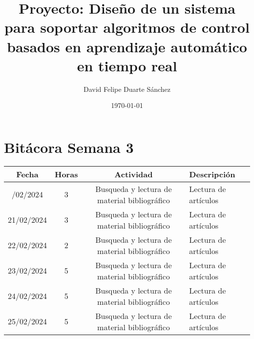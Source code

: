 \documentclass{article}
\title{Proyecto: Diseño de un sistema para soportar algoritmos de control basados en aprendizaje automático en tiempo real}
\author{David Felipe Duarte Sánchez}
\date{\today}
\begin{document}
\maketitle
\section*{Bitácora Semana 3}

\begin{longtable}[c]{|c|c|c|p{6cm}|}
\hline
\textbf{Fecha} & \textbf{Horas} & \textbf{Actividad} & \textbf{Descripción} \\
\hline
\endhead
\hline
\endfoot
20/02/2024 & 3 & Busqueda y lectura de material bibliográfico & Lectura de artículos \cite{Khamis_2013} \cite{Albertos_2005} \cite{Bruzzone_2006}\\
21/02/2024 & 3 & Busqueda y lectura de material bibliográfico & Lectura de artículos \cite{Kume_2009} \cite{Hristu-Varsakelis_2007} \cite{Zhao_2021}\\
22/02/2024 & 2 & Busqueda y lectura de material bibliográfico & Lectura de artículos \cite{Kraft_1994} \cite{Auslander_1995}\\
23/02/2024 & 5 & Busqueda y lectura de material bibliográfico & Lectura de artículos \cite{Rath_2015} \cite{Gu_2004} \cite{Eriksson_2007} \cite{Fang_2011} \cite{Schmidt_2020}  \cite{8751767}\\
24/02/2024 & 5 & Busqueda y lectura de material bibliográfico & Lectura de artículos \cite{4155305} \cite{Ma2008IntegratedDA} \cite{5968809} \cite{Nelson_1994} \cite{Ma_2008}\\
25/02/2024 & 5 & Busqueda y lectura de material bibliográfico & Lectura de artículos \cite{4756316} \cite{Shao2012TheID} \cite{735019} \cite{7181866}  \cite{8242925} \\
\hline
\end{longtable}

\vspace{6cm}



\end{document}
